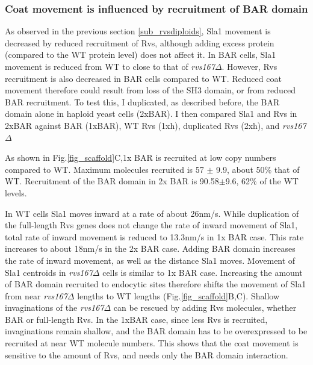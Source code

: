 	\subsubsection{Coat movement is influenced by recruitment of BAR domain }
As observed in the previous section \ref{sub_rvsdiploids}, Sla1 movement is decreased by reduced recruitment of Rvs, although adding excess protein (compared to the WT protein level) does not affect it. In BAR cells, Sla1 movement is reduced from WT to close to that of \textit{rvs167$\Delta$}. However, Rvs recruitment is also decreased in BAR cells compared to WT. Reduced coat movement therefore could result from loss of the SH3 domain, or from reduced BAR recruitment. To test this, I duplicated, as described before, the BAR domain alone in haploid yeast cells (2xBAR). I then compared Sla1 and Rvs in 2xBAR against BAR (1xBAR), WT Rvs (1xh), duplicated Rvs (2xh), and \textit{rvs167$\Delta$}

	\vspace{5mm}
 As shown in Fig.\ref{fig_scaffold}C,1x BAR is recruited at low copy numbers compared to WT. Maximum molecules recruited is 57 $\pm$ 9.9, about 50\% that of WT. Recruitment of the BAR domain in 2x BAR is 90.58$\pm$9.6, 62\% of the WT levels. 
 
	\vspace{5mm}
In WT cells Sla1 moves inward at a rate of about 26nm/s. While duplication of the full-length Rvs genes does not change the rate of inward movement of Sla1, total rate of inward movement is reduced to 13.3nm/s in 1x BAR case. This rate increases to about 18nm/s in the 2x BAR case. Adding BAR domain increases the rate of inward movement, as well as the distance Sla1 moves. Movement of Sla1 centroids in \textit{rvs167$\Delta$} cells is similar to 1x BAR case. Increasing the amount of BAR domain recruited to endocytic sites therefore shifts the movement of Sla1 from near \textit{rvs167$\Delta$} lengths to WT lengths (Fig.\ref{fig_scaffold}B,C).
	\vspace{5mm}
Shallow invaginations of the \textit{rvs167$\Delta$} can be rescued by adding Rvs molecules, whether BAR or full-length Rvs. In the 1xBAR case, since less Rvs is recruited, invaginations remain shallow, and the BAR domain has to be overexpressed to be recruited at near WT molecule numbers.
This shows that the coat movement is sensitive to the amount of Rvs, and needs only the BAR domain interaction.



